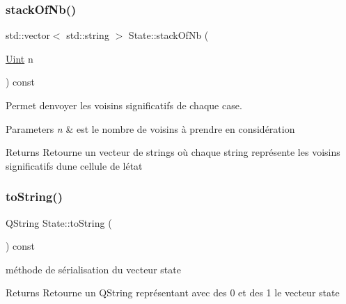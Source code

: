 \mbox{\label{class_state_a9681c4601cfbcd05f9c203770105bd1e}} 
\subsubsection{\texorpdfstring{stack\+Of\+Nb()}{stackOfNb()}}
{\footnotesize\ttfamily std\+::vector$<$ std\+::string $>$ State\+::stack\+Of\+Nb (\begin{DoxyParamCaption}\item[{\mbox{\hyperlink{state_8h_a4840c4503b7d10cea5e08416eb3716f1}{Uint}}}]{n }\end{DoxyParamCaption}) const}



Permet d\textquotesingle{}envoyer les voisins significatifs de chaque case. 


\begin{DoxyParams}{Parameters}
{\em n} & est le nombre de voisins à prendre en considération \\
\hline
\end{DoxyParams}
\begin{DoxyReturn}{Returns}
Retourne un vecteur de strings où chaque string représente les voisins significatifs d\textquotesingle{}une cellule de l\textquotesingle{}état 
\end{DoxyReturn}
\mbox{\label{class_state_aeadbbdbf52ed603425180ccb53d841cd}} 
\subsubsection{\texorpdfstring{to\+String()}{toString()}}
{\footnotesize\ttfamily Q\+String State\+::to\+String (\begin{DoxyParamCaption}{ }\end{DoxyParamCaption}) const}



méthode de sérialisation du vecteur state 

\begin{DoxyReturn}{Returns}
Retourne un Q\+String représentant avec des 0 et des 1 le vecteur state 
\end{DoxyReturn}
\mbox{\label{class_state_a7a3e3dd36808cc394e8514902d55b856}} 
